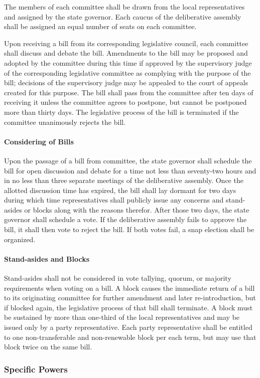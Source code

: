 \documentclass{article}
\begin{document}
The members of each committee shall be drawn from the local representatives and assigned by the state governor. Each caucus of the deliberative assembly shall be assigned an equal number of seats on each committee. 

Upon receiving a bill from its corresponding legislative council, each committee shall discuss and debate the bill. Amendments to the bill may be proposed and adopted by the committee during this time if approved by the supervisory judge of the corresponding legislative committee as complying with the purpose of the bill; decisions of the supervisory judge may be appealed to the court of appeals created for this purpose. The bill shall pass from the committee after ten days of receiving it unless the committee agrees to postpone, but cannot be postponed more than thirty days. The legislative process of the bill is terminated if the committee unanimously rejects the bill.
\paragraph{Considering of Bills}
Upon the passage of a bill from committee, the state governor shall schedule the bill for open discussion and debate for a time not less than seventy-two hours and in no less than three separate meetings of the deliberative assembly. Once the allotted discussion time has expired, the bill shall lay dormant for two days during which time representatives shall publicly issue any concerns and stand-asides or blocks along with the reasons therefor. After those two days, the state governor shall schedule a vote. If the deliberative assembly fails to approve the bill, it shall then vote to reject the bill. If both votes fail, a snap election shall be organized.
\paragraph{Stand-asides and Blocks}
Stand-asides shall not be considered in vote tallying, quorum, or majority requirements when voting on a bill. A block causes the immediate return of a bill to its originating committee for further amendment and later re-introduction, but if blocked again, the legislative process of that bill shall terminate. A block must be sustained by more than one-third of the local representatives and may be issued only by a party representative. Each party representative shall be entitled to one non-transferable and non-renewable block per each term, but may use that block twice on the same bill.
\subsubsection{Specific Powers}
\end{document}
